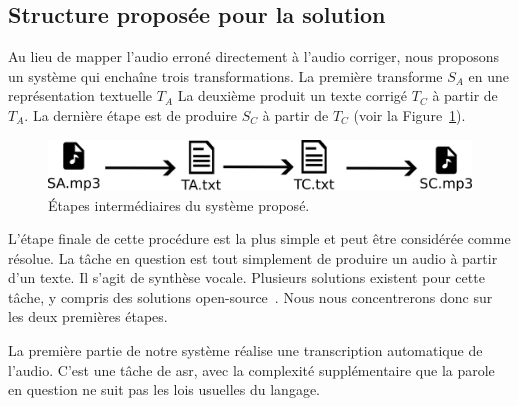 \subsection{Structure proposée pour la solution}

Au lieu de mapper l'audio erroné directement à l'audio corriger,
nous proposons un système qui enchaîne trois transformations.
La première transforme \(S_A\) en une représentation textuelle \(T_A\)
La deuxième produit un texte corrigé \(T_C\) à partir de \(T_A\).
La dernière étape est de produire \(S_C\) à partir de \(T_C\) (voir la Figure~\ref{fig.detail-system}).

\begin{figure}[hbt]
    \centering
    \includegraphics[width=\linewidth]{assets/images/detail.png}
    \caption{Étapes intermédiaires du système proposé.}
    \label{fig.detail-system}
\end{figure}

L'étape finale de cette procédure est la plus simple et peut être considérée comme résolue.
La tâche en question est tout simplement de produire un audio à partir d'un texte.
Il s'agit de synthèse vocale.
Plusieurs solutions existent pour cette tâche, y compris des solutions open-source~\cite{Tan_et_al._2022}.
Nous nous concentrerons donc sur les deux premières étapes.

La première partie de notre système réalise une transcription automatique de l'audio.
C'est une tâche de \gls{asr}, 
avec la complexité supplémentaire que la parole en question ne suit pas les lois usuelles du langage.
